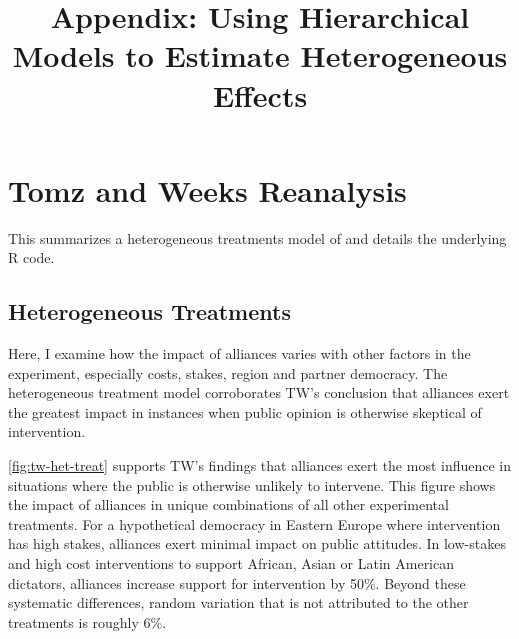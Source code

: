 \documentclass[12pt]{article}
\title{\textbf{Appendix: Using Hierarchical Models to Estimate Heterogeneous Effects}}
\date{}
\begin{document}
\maketitle 

\singlespace 

\tableofcontents


\section{Tomz and Weeks Reanalysis}

This summarizes a heterogeneous treatments model of \citep{TomzWeeks2021} and details the underlying \textsf{R} code. 

\subsection{Heterogeneous Treatments} 

Here, I examine how the impact of alliances varies with other factors in the experiment, especially costs, stakes, region and partner democracy.
The heterogeneous treatment model corroborates TW's conclusion that alliances exert the greatest impact in instances when public opinion is otherwise skeptical of intervention.

\autoref{fig:tw-het-treat} supports TW's findings that alliances exert the most influence in situations where the public is otherwise unlikely to intervene. 
This figure shows the impact of alliances in unique combinations of all other experimental treatments. 
For a hypothetical democracy in Eastern Europe where intervention has high stakes, alliances exert minimal impact on public attitudes. 
In low-stakes and high cost interventions to support African, Asian or Latin American dictators, alliances increase support for intervention by 50\%. 
Beyond these systematic differences, random variation that is not attributed to the other treatments is roughly 6\%. 
\end{document}

